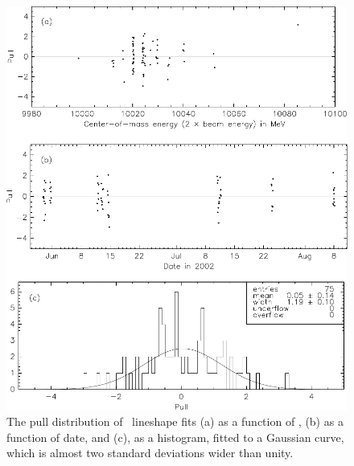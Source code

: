 \documentclass{cornell}
\begin{document}
\begin{figure}[p]
  \begin{center}
    \includegraphics[width=\linewidth]{plots/pullstwo}
  \end{center}
  \caption{\label{pullstwo} The pull distribution of \uss\ lineshape
  fits (a) as a function of \ecm, (b) as a function of date, and (c),
  as a histogram, fitted to a Gaussian curve, which is almost two
  standard deviations wider than unity.}
\end{figure}
\end{document}
